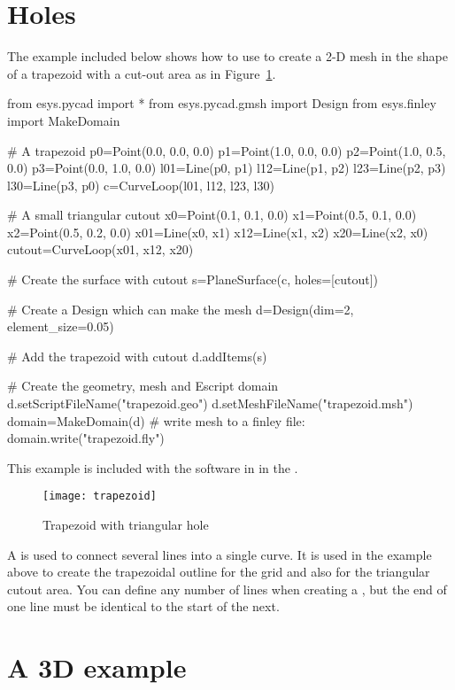 \section{Holes}
The example included below shows how to use \pycad to create a 2-D mesh
in the shape of a trapezoid with a cut-out area as in Figure~\ref{fig:PYCAD 1}.

\begin{python}
  from esys.pycad import *
  from esys.pycad.gmsh import Design
  from esys.finley import MakeDomain
  
  # A trapezoid
  p0=Point(0.0, 0.0, 0.0)
  p1=Point(1.0, 0.0, 0.0)
  p2=Point(1.0, 0.5, 0.0)
  p3=Point(0.0, 1.0, 0.0)
  l01=Line(p0, p1)
  l12=Line(p1, p2)
  l23=Line(p2, p3)
  l30=Line(p3, p0)
  c=CurveLoop(l01, l12, l23, l30)
  
  # A small triangular cutout
  x0=Point(0.1, 0.1, 0.0)
  x1=Point(0.5, 0.1, 0.0)
  x2=Point(0.5, 0.2, 0.0)
  x01=Line(x0, x1)
  x12=Line(x1, x2)
  x20=Line(x2, x0)
  cutout=CurveLoop(x01, x12, x20)
  
  # Create the surface with cutout
  s=PlaneSurface(c, holes=[cutout])
  
  # Create a Design which can make the mesh
  d=Design(dim=2, element_size=0.05)
  
  # Add the trapezoid with cutout
  d.addItems(s)
  
  # Create the geometry, mesh and Escript domain
  d.setScriptFileName("trapezoid.geo")
  d.setMeshFileName("trapezoid.msh")
  domain=MakeDomain(d)
  # write mesh to a finley file:
  domain.write("trapezoid.fly")
\end{python}
This example is included with the software in  in the
\ExampleDirectory.

\begin{figure}
\centerline{\texttt{[image: trapezoid]}}
\caption{Trapezoid with triangular hole}
\label{fig:PYCAD 1}
\end{figure}

A  is used to connect several lines into a single curve.
It is used in the example above to create the trapezoidal outline for the grid
and also for the triangular cutout area.
You can define any number of lines when creating a , but
the end of one line must be identical to the start of the next.

\section{A 3D example}


